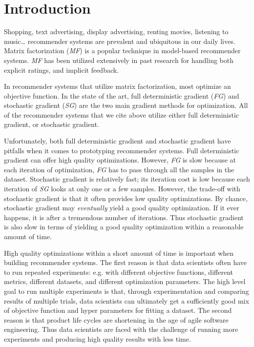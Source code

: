 \section{Introduction}
Shopping, text advertising, display advertising, renting movies, listening to music… recommender systems are prevalent and ubiquitous in our daily lives.  
Matrix factorization (\emph{MF}) is a popular technique in model-based recommender systems.  
\emph{MF} has been utilized extensively in past research for handling both explicit \cite{mmmf2005fast, mnar, gapfm} ratings, and implicit \cite{wrmf2008hu, wrmf2008pan, climf, bpr, mnar} feedback.  

In recommender systems that utilize matrix factorization, most optimize an objective function.  
In the state of the art, full deterministic gradient (\emph{FG}) and stochastic gradient (\emph{SG}) are the two main gradient methods for optimization.  
All of the recommender systems that we cite above utilize either full deterministic gradient, or stochastic gradient.

Unfortunately, both full deterministic gradient and stochastic gradient have pitfalls when it comes to prototyping recommender systems.  
Full deterministic gradient can offer high quality optimizations.  
However, \emph{FG} is slow because at each iteration of optimization, \emph{FG} has to pass through all the samples in the dataset.  
Stochastic gradient is relatively fast; its iteration cost is low because each iteration of \emph{SG} looks at only one or a few samples.  
However, the trade-off with stochastic gradient is that it often provides low quality optimizations.  
By chance, stochastic gradient may \emph{eventually} yield a good quality optimization. 
If it ever happens, it is after a tremendous number of iterations.  
Thus stochastic gradient is also slow in terms of yielding a good quality optimization within a reasonable amount of time.

High quality optimizations within a short amount of time is important when building recommender systems.  
The first reason is that data scientists often have to run repeated experiments: e.g. with different objective functions, different metrics, different datasets, and different optimization parameters.  
The high level goal to run multiple experiments is that, through experimentation and comparing results of multiple trials, 
data scientists can ultimately get a sufficiently good mix of objective function and hyper parameters for fitting a dataset.  
The second reason is that product life cycles are shortening in the age of agile software engineering.  
Thus data scientists are faced with the challenge of running more experiments and producing high quality results with less time.  

